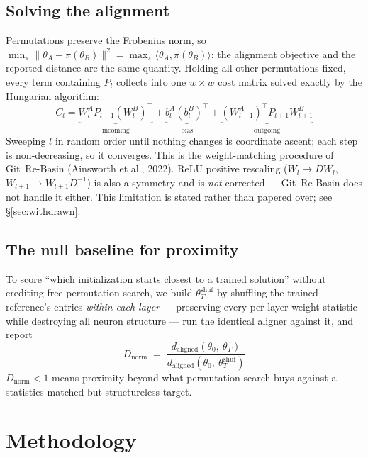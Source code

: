 \documentclass[11pt]{article}
\begin{document}
\subsection{Solving the alignment}

Permutations preserve the Frobenius norm, so
$\min_\pi \|\theta_A - \pi(\theta_B)\|^2 = \max_\pi \langle \theta_A, \pi(\theta_B)\rangle$: the
alignment objective and the reported distance are the same quantity. Holding all other
permutations fixed, every term containing $P_l$ collects into one $w\times w$ cost matrix solved
exactly by the Hungarian algorithm:
\begin{equation}
C_l = \underbrace{W_l^A P_{l-1} (W_l^B)^{\top}}_{\text{incoming}}
    + \underbrace{b_l^A (b_l^B)^{\top}}_{\text{bias}}
    + \underbrace{(W_{l+1}^A)^{\top} P_{l+1} W_{l+1}^B}_{\text{outgoing}}
\end{equation}
Sweeping $l$ in random order until nothing changes is coordinate ascent; each step is
non-decreasing, so it converges. This is the weight-matching procedure of Git~Re-Basin
(Ainsworth et al., 2022). ReLU positive rescaling ($W_l\to DW_l$, $W_{l+1}\to W_{l+1}D^{-1}$) is
also a symmetry and is \emph{not} corrected --- Git~Re-Basin does not handle it either. This
limitation is stated rather than papered over; see \S\ref{sec:withdrawn}.

\subsection{The null baseline for proximity}
\label{sec:null}

To score ``which initialization starts closest to a trained solution'' without crediting free
permutation search, we build $\theta_T^{\text{shuf}}$ by shuffling the trained reference's
entries \emph{within each layer} --- preserving every per-layer weight statistic while destroying
all neuron structure --- run the identical aligner against it, and report
\begin{equation}
D_{\text{norm}} \;=\; \frac{d_{\text{aligned}}(\theta_0,\ \theta_T)}
                           {d_{\text{aligned}}(\theta_0,\ \theta_T^{\text{shuf}})}
\end{equation}
$D_{\text{norm}} < 1$ means proximity beyond what permutation search buys against a
statistics-matched but structureless target.

\section{Methodology}
\end{document}
